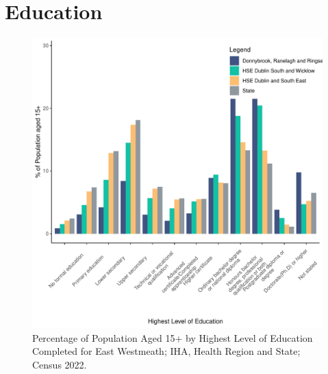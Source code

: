 \documentclass{article}
\begin{document}
\section{Education}\label{sect:Edu}
\begin{figure}[H]
	\centering
	\includegraphics[width = 120mm]{../figures/EduED.pdf}
	\caption{Percentage of Population Aged 15+ by Highest Level of Education Completed for East Westmeath; IHA, Health Region and State; Census 2022.}
	\label{fig:vbnv}
	\end{figure}
\end{document}
